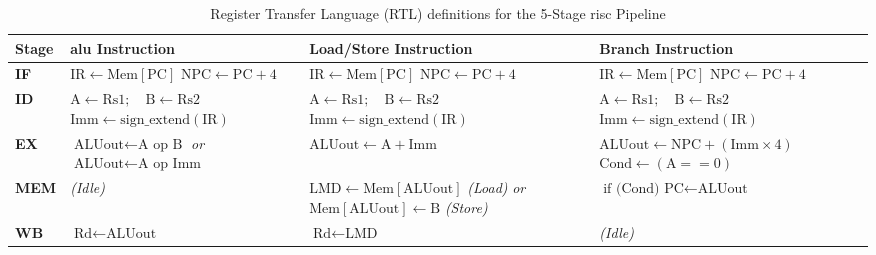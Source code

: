 \begin{table}[!htbp]
    \centering
    \renewcommand{\arraystretch}{1.5} %
    \begin{tabular}{| >{\raggedright\arraybackslash}p{} | >{\raggedright\arraybackslash}p{} | >{\raggedright\arraybackslash}p{} | >{\raggedright\arraybackslash}p{} |}
         \hline
         \textbf{Stage} & \textbf{\gls{alu} Instruction} & \textbf{Load/Store Instruction} & \textbf{Branch Instruction} \\
         \hline\hline
         
         \textbf{IF} & 
         \(\text{IR} \leftarrow \text{Mem}[\text{PC}]\) \newline \(\text{NPC} \leftarrow \text{PC} + 4\) & 
         \(\text{IR} \leftarrow \text{Mem}[\text{PC}]\) \newline \(\text{NPC} \leftarrow \text{PC} + 4\) & 
         \(\text{IR} \leftarrow \text{Mem}[\text{PC}]\) \newline \(\text{NPC} \leftarrow \text{PC} + 4\) \\
         \hline
         
         \textbf{ID} & 
         \(\text{A} \leftarrow \text{Rs1}; \quad \text{B} \leftarrow \text{Rs2}\) \newline \(\text{Imm} \leftarrow \text{sign\_extend}(\text{IR})\) & 
         \(\text{A} \leftarrow \text{Rs1}; \quad \text{B} \leftarrow \text{Rs2}\) \newline \(\text{Imm} \leftarrow \text{sign\_extend}(\text{IR})\) & 
         \(\text{A} \leftarrow \text{Rs1}; \quad \text{B} \leftarrow \text{Rs2}\) \newline \(\text{Imm} \leftarrow \text{sign\_extend}(\text{IR})\) \\
         \hline
         
         \textbf{EX} & 
         \(\text{ALUout} \leftarrow \text{A op B}\) \newline \textit{or} \(\text{ALUout} \leftarrow \text{A op Imm}\) & 
         \(\text{ALUout} \leftarrow \text{A} + \text{Imm}\) & 
         \(\text{ALUout} \leftarrow \text{NPC} + (\text{Imm} \times 4)\) \newline \(\text{Cond} \leftarrow (\text{A} == 0)\) \\
         \hline
         
         \textbf{MEM} & 
         \textit{(Idle)} & 
         \(\text{LMD} \leftarrow \text{Mem}[\text{ALUout}]\) \textit{(Load)} \newline \textit{or} \(\text{Mem}[\text{ALUout}] \leftarrow \text{B}\) \textit{(Store)} & 
         \(\text{if (Cond) PC} \leftarrow \text{ALUout}\) \\
         \hline
         
         \textbf{WB} & 
         \(\text{Rd} \leftarrow \text{ALUout}\) & 
         \(\text{Rd} \leftarrow \text{LMD}\) & 
         \textit{(Idle)} \\
         \hline
    \end{tabular}
    \caption{Register Transfer Language (RTL) definitions for the 5-Stage \gls{risc} Pipeline}
    \label{tab:pipeline-rtl}
\end{table}

